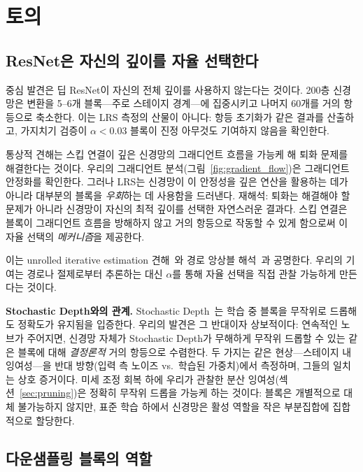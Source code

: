 \documentclass{bmvc2k}
\begin{document}
\section{토의}
\label{sec:discussion}

\subsection{ResNet은 자신의 깊이를 자율 선택한다}

중심 발견은 딥 ResNet이 자신의 전체 깊이를 사용하지 않는다는 것이다. 200층 신경망은 변환을 5--6개 블록---주로 스테이지 경계---에 집중시키고 나머지 60개를 거의 항등으로 축소한다. 이는 LRS 측정의 산물이 아니다: 항등 초기화가 같은 결과를 산출하고, 가지치기 검증이 $\alpha < 0.03$ 블록이 진정 아무것도 기여하지 않음을 확인한다.

통상적 견해는 스킵 연결이 깊은 신경망의 그래디언트 흐름을 가능케 해 퇴화 문제를 해결한다는 것이다. 우리의 그래디언트 분석(그림~\ref{fig:gradient_flow})은 그래디언트 안정화를 확인한다. 그러나 LRS는 신경망이 이 안정성을 깊은 연산을 활용하는 데가 아니라 대부분의 블록을 \emph{우회}하는 데 사용함을 드러낸다. 재해석: 퇴화는 해결해야 할 문제가 아니라 신경망이 자신의 최적 깊이를 선택한 자연스러운 결과다. 스킵 연결은 블록이 그래디언트 흐름을 방해하지 않고 거의 항등으로 작동할 수 있게 함으로써 이 자율 선택의 \emph{메커니즘}을 제공한다.

이는 unrolled iterative estimation 견해~\cite{greff2017highway}와 경로 앙상블 해석~\cite{veit2016residual}과 공명한다. 우리의 기여는 경로나 절제로부터 추론하는 대신 $\alpha$를 통해 자율 선택을 직접 관찰 가능하게 만든다는 것이다.

\textbf{Stochastic Depth와의 관계.} Stochastic Depth~\cite{huang2016deep}는 학습 중 블록을 무작위로 드롭해도 정확도가 유지됨을 입증한다. 우리의 발견은 그 반대이자 상보적이다: 연속적인 노브가 주어지면, 신경망 자체가 Stochastic Depth가 무해하게 무작위 드롭할 수 있는 같은 블록에 대해 \emph{결정론적} 거의 항등으로 수렴한다. 두 가지는 같은 현상---스테이지 내 잉여성---을 반대 방향(입력 측 노이즈 vs.\ 학습된 가중치)에서 측정하며, 그들의 일치는 상호 증거이다. 미세 조정 회복 하에 우리가 관찰한 분산 잉여성(섹션~\ref{sec:pruning})은 정확히 무작위 드롭을 가능케 하는 것이다: 블록은 개별적으로 대체 불가능하지 않지만, 표준 학습 하에서 신경망은 활성 역할을 작은 부분집합에 집합적으로 할당한다.

\subsection{다운샘플링 블록의 역할}
\label{sec:downsampling_role}
\end{document}
